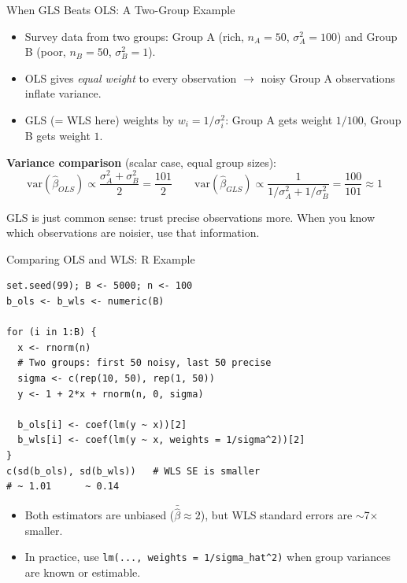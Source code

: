 \documentclass[aspectratio=169, handout]{beamer}
\numberwithin{equation}{section}
\begin{document}
\begin{frame}{When GLS Beats OLS: A Two-Group Example}
\begin{itemize}\setlength{\itemsep}{1pt}
\item Survey data from two groups: Group A (rich, $n_A=50$, $\sigma_A^2=100$) and Group B (poor, $n_B=50$, $\sigma_B^2=1$).
\item OLS gives \emph{equal weight} to every observation $\to$ noisy Group A observations inflate variance.
\item GLS (= WLS here) weights by $w_i=1/\sigma_i^2$: Group A gets weight $1/100$, Group B gets weight $1$.
\end{itemize}
\smallskip
\textbf{Variance comparison} (scalar case, equal group sizes):
$$\text{var}(\hat{\beta}_{OLS})\propto \frac{\sigma_A^2+\sigma_B^2}{2}=\frac{101}{2}\qquad \text{var}(\hat{\beta}_{GLS})\propto \frac{1}{1/\sigma_A^2+1/\sigma_B^2}=\frac{100}{101}\approx 1$$
\vspace{-0.5em}
\begin{tcolorbox}[colback=blue!5, colframe=blue!50, boxsep=2pt, top=2pt, bottom=2pt]
GLS is just common sense: trust precise observations more. When you know which observations are noisier, use that information.
\end{tcolorbox}
\end{frame}

\begin{frame}[fragile]{Comparing OLS and WLS: R Example}
\begin{lstlisting}[basicstyle=\ttfamily\scriptsize]
set.seed(99); B <- 5000; n <- 100
b_ols <- b_wls <- numeric(B)

for (i in 1:B) {
  x <- rnorm(n)
  # Two groups: first 50 noisy, last 50 precise
  sigma <- c(rep(10, 50), rep(1, 50))
  y <- 1 + 2*x + rnorm(n, 0, sigma)

  b_ols[i] <- coef(lm(y ~ x))[2]
  b_wls[i] <- coef(lm(y ~ x, weights = 1/sigma^2))[2]
}
c(sd(b_ols), sd(b_wls))   # WLS SE is smaller
# ~ 1.01      ~ 0.14
\end{lstlisting}
\vspace{0.3em}
\begin{itemize}
\item Both estimators are unbiased ($\bar{\hat{\beta}}\approx 2$), but WLS standard errors are $\sim$7$\times$ smaller.
\item In practice, use \texttt{lm(..., weights = 1/sigma\_hat\^{}2)} when group variances are known or estimable.
\end{itemize}
\end{frame}
\end{document}

